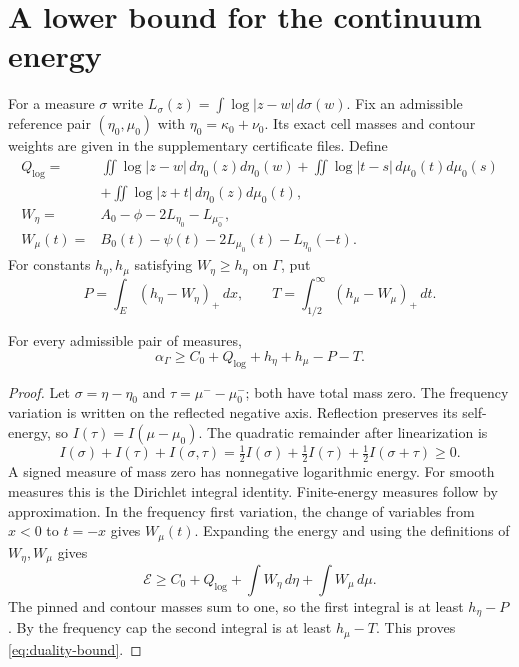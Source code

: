 \section{A lower bound for the continuum energy}\label{sec:dual}

For a measure $\sigma$ write
$L_\sigma(z)=\int\log|z-w|\,d\sigma(w)$. Fix an admissible reference
pair $(\eta_0,\mu_0)$ with $\eta_0=\kappa_0+\nu_0$. Its exact cell masses
and contour weights are given in the supplementary certificate files.
Define
\[
\begin{aligned}
Q_{\log}={}&\iint\log|z-w|\,d\eta_0(z)d\eta_0(w)
 +\iint\log|t-s|\,d\mu_0(t)d\mu_0(s)\\
 &+\iint\log|z+t|\,d\eta_0(z)d\mu_0(t),\\
W_\eta={}&A_0-\phi-2L_{\eta_0}-L_{\mu_0^-},\\
W_\mu(t)={}&B_0(t)-\psi(t)-2L_{\mu_0}(t)-L_{\eta_0}(-t).
\end{aligned}
\]
For constants $h_\eta,h_\mu$ satisfying $W_\eta\ge h_\eta$ on $\Gamma$,
put
\[
P=\int_E(h_\eta-W_\eta)_+\,dx,
\qquad T=\int_{1/2}^{\infty}(h_\mu-W_\mu)_+\,dt.
\]

\begin{lemma}\label{lem:dual-lower}
For every admissible pair of measures,
\begin{equation}
\alpha_\Gamma\ge C_0+Q_{\log}+h_\eta+h_\mu-P-T.
\label{eq:duality-bound}
\end{equation}
\end{lemma}

\begin{proof}
Let $\sigma=\eta-\eta_0$ and $\tau=\mu^- -\mu_0^-$; both have total
mass zero. The frequency variation is written on the reflected negative
axis. Reflection preserves its self-energy, so $I(\tau)=I(\mu-\mu_0)$.
The quadratic remainder after linearization is
\[
I(\sigma)+I(\tau)+I(\sigma,\tau)
 =\tfrac12 I(\sigma)+\tfrac12 I(\tau)+\tfrac12 I(\sigma+\tau)\ge0.
\]
A signed measure of mass zero has nonnegative logarithmic energy. For
smooth measures this is the Dirichlet integral identity. Finite-energy
measures follow by approximation. In the frequency first variation, the
change of variables from $x<0$ to $t=-x$ gives $W_\mu(t)$. Expanding the
energy and using the definitions of $W_\eta,W_\mu$ gives
\[
\mathcal E\ge C_0+Q_{\log}+\int W_\eta\,d\eta+\int W_\mu\,d\mu.
\]
The pinned and contour masses sum to one, so the first integral is at
least $h_\eta-P$. By the frequency cap the second integral is at least
$h_\mu-T$. This proves \eqref{eq:duality-bound}.
\end{proof}

